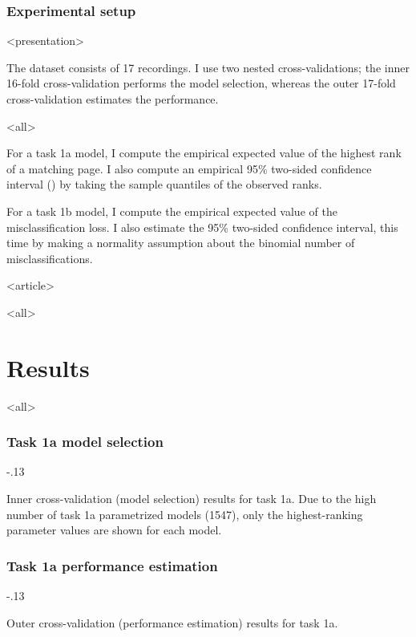 \begin{frame}
\frametitle<presentation>{Experimental setup}

\mode
<presentation>

The dataset consists of 17 recordings. I use two nested cross-validations; the
inner 16-fold cross-validation performs the model selection, whereas the
outer 17-fold cross-validation estimates the performance.\pause

\mode
<all>

For a task 1a model, I compute the empirical expected value of the highest rank
of a matching page. I also compute an empirical 95\% two-sided confidence
interval () by taking the sample quantiles of the observed ranks.\pause
  
For a task 1b model, I compute the empirical expected value of the
misclassification loss. I also estimate the 95\% two-sided confidence interval,
this time by making a normality assumption about the binomial number of
misclassifications.
\end{frame}

\mode
<article>


\mode
<all>{%
\section{Results}
\label{sec:results}}

\mode
<all>

\begin{frame}[fragile]
\frametitle<presentation>{Task 1a model selection}
\begin{table}
\ifarticle
  \leavevmode\kern-.13\textwidth
\fi

\caption{Inner cross-validation (model selection) results for task 1a. Due to
  the high number of task 1a parametrized models (1547), only the
  highest-ranking parameter values are shown for each model.}
\label{tab:model-selection-task1a}
\end{table}
\end{frame}

\begin{frame}[fragile]
\frametitle<presentation>{Task 1a performance estimation}
\begin{table}
\ifarticle
  \leavevmode\kern-.13\textwidth
\fi

\caption{Outer cross-validation (performance estimation) results for task 1a.}
\label{tab:performance-estimation-task1a}
\end{table}
\end{frame}

